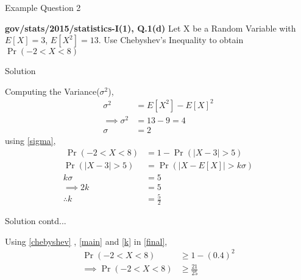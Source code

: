 \documentclass{beamer}
\providecommand{\pr}[1]{\ensuremath{\Pr\left(#1\right)}}
\begin{document}
\begin{frame}{Example Question 2}
\begin{block}{\textbf{gov/stats/2015/statistics-I(1), Q.1(d)}}
Let X be a Random Variable with $E[X] = 3$, $E[X^2] = 13$. Use Chebyshev's Inequality to obtain $\pr{-2 < X < 8}$
\end{block}
\end{frame}
\begin{frame}{Solution}
    \begin{block}{}
    Computing the Variance($\sigma ^{2}$),
\begin{align}
    \sigma^{2} &= E[X^2] - E[X]^2 \\
    \implies \sigma^{2} &= 13 - 9 = 4 \\
    \label{sigma}
    \sigma &= 2
    \end{align}
    using \eqref{sigma},
\begin{align}\
\label{final}
    \pr{-2 < X < 8} &= 1 - \pr{\lvert X - 3 \rvert > 5} \\
     \label{main}
    \pr{\lvert X - 3 \rvert > 5} &= \pr{\lvert X - E[X] \rvert > k\sigma} \\
    k\sigma &= 5 \\
    \implies 2k &= 5 \\
     \label{k}
    \therefore k &= \frac{5}{2}
\end{align}
    \end{block}
\end{frame}
\begin{frame}{Solution contd...}
    \begin{block}{}
    Using \eqref{chebyshev} , \eqref{main} and \eqref{k} in \eqref{final},
    \begin{align}
    \pr{-2 < X < 8} &\ge 1 - (0.4)^{2} \\
     \label{result}
\implies \pr{-2 < X < 8} &\ge \frac{21}{25}
\end{align}
    \end{block}
\end{frame}
\end{document}
